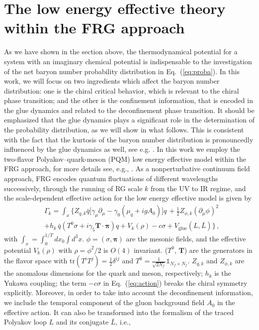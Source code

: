 \documentclass[%
reprint,
superscriptaddress,
showpacs,preprintnumbers,
 amsmath,amssymb,
 aps,
prd,
]{revtex4-1}
\def\Eq#1{Eq.~(\ref{#1})}
\begin{document}
\section{The low energy effective theory within the FRG approach}
\label{sec:PQM}

As we have shown in the section above, the thermodynamical potential for a system with an imaginary chemical potential is indispensable to the investigation of the net baryon number probability distribution in \Eq{eq:proba}. In this work, we will focus on two ingredients which affect the baryon number distribution: one is the chiral critical behavior, which is relevant to the chiral phase transition; and the other is the confinement information, that is encoded in the glue dynamics and related to the deconfinement phase transition. It should be emphasized that the glue dynamics plays a significant role in the determination of the probability distribution, as we will show in what follows. This is consistent with the fact that the kurtosis of the baryon number distribution is pronouncedly influenced by the glue dynamics as well, see e.g. \cite{Fu:2015naa,Fu:2018wxq}. In this work we employ the two-flavor Polyakov--quark-meson (PQM) low energy effective model within the FRG approach, for more details see, e.g., \cite{Fu:2015naa,Fu:2015amv,Fu:2016tey}. As a nonperturbative continuum field approach, FRG encodes quantum fluctuations of different wavelengths successively, through the running of RG scale $k$ from the UV to IR regime, and the scale-dependent effective action for the low energy effective model is given by
\begin{align}
  &\Gamma_{k}=\int_{x}\bigg\{Z_{q,k}\bar{q}\big[\gamma_{\mu}\partial_{\mu}-\gamma_{0}(\mu_q+igA_0)\big] q\, +\frac{1}{2}Z_{\phi,k}(\partial_{\mu}\phi)^2\nonumber\\[2ex]
  &+h_{k} \,\bar{q}\left(T^{0}\sigma+i\gamma_{5} \bm{T}\cdot\bm{\pi}\right) q+V_{k}(\rho)-c\sigma+ V_\text{glue}(L,\bar L)\bigg\}\,,\label{eq:action}
\end{align}
with $\int_x=\int_0^{1/T}d x_0 \int d^3 x$. $\phi=(\sigma,\bm{\pi})$ are the mesonic fields, and the effective potential $V_{k}(\rho)$ with $\rho=\phi^2/2$ is $O(4)$ invariant. ($T^{0}$, $\bm{T}$) are the generators in the flavor space with $\mathrm{tr}(T^{i}T^{j})=\frac{1}{2}\delta^{ij}$ and $T^{0}=\frac{1}{\sqrt{2N_{f}}}\mathbb{1}_{N_{f}\times N_{f}}$. $Z_{q,k}$ and $Z_{\phi,k}$ are the anomalous dimensions for the quark and meson, respectively; $h_{k}$ is the Yukawa coupling; the term $-c\sigma$ in \Eq{eq:action} breaks the chiral symmetry explicitly. Moreover, in order to take into account the deconfinement information, we include the temporal component of the gluon background field $A_0$  in the effective action. It can also be transformed into the formalism of the traced Polyakov loop $L$ and its conjugate $\bar L$, i.e.,
\end{document}
